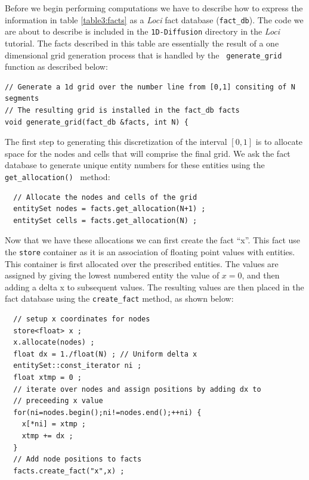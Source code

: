 \documentclass[10pt,epsf,letterpaper,twoside]{book}
\begin{document}
Before we begin performing computations we have to describe how to
express the information in table \ref{table3:facts} as a {\it Loci} fact
database ({\tt fact\_db}).  The code we are about to describe is
included in the {\tt 1D-Diffusion} directory in the {\it Loci} tutorial.
The facts described in this table are essentially the result of a one
dimensional grid generation process that is handled by the {\tt
  generate\_grid} function as described below:
\begin{verbatim}
// Generate a 1d grid over the number line from [0,1] consiting of N segments
// The resulting grid is installed in the fact_db facts 
void generate_grid(fact_db &facts, int N) {
\end{verbatim}
The first step to generating this discretization of the interval
$[0,1]$ is to allocate space for the nodes and cells that will
comprise the final grid.  We ask the fact database to generate unique
entity numbers for these entities using the {\tt get\_allocation() }
method:
\begin{verbatim}
  // Allocate the nodes and cells of the grid
  entitySet nodes = facts.get_allocation(N+1) ;
  entitySet cells = facts.get_allocation(N) ;
\end{verbatim}
Now that we have these allocations we can first create the fact
``x''.  This fact use the {\tt store} container as it is an
association of floating point values with entities.  This container is
first allocated over the prescribed entities.  The values are assigned
by giving the lowest numbered entity the value of $x=0$, and then
adding a delta x to subsequent values.  The resulting values are then
placed in the fact database using the {\tt create\_fact} method, as
shown below:
\begin{verbatim}
  // setup x coordinates for nodes
  store<float> x ;
  x.allocate(nodes) ;
  float dx = 1./float(N) ; // Uniform delta x
  entitySet::const_iterator ni ;
  float xtmp = 0 ;
  // iterate over nodes and assign positions by adding dx to
  // preceeding x value
  for(ni=nodes.begin();ni!=nodes.end();++ni) {
    x[*ni] = xtmp ;
    xtmp += dx ;
  }
  // Add node positions to facts
  facts.create_fact("x",x) ;
\end{verbatim}
\end{document}
